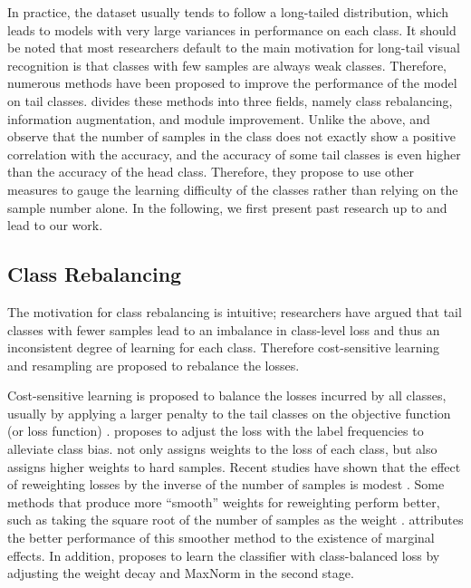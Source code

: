 \documentclass[10pt,twocolumn,letterpaper]{article}
\begin{document}
In practice, the dataset usually tends to follow a long-tailed distribution, which leads to models with very large variances in performance on each class. It should be noted that most researchers default to the main motivation for long-tail visual recognition is that classes with few samples are always weak classes. Therefore, numerous methods have been proposed to improve the performance of the model on tail classes. \cite{paper58} divides these methods into three fields, namely class rebalancing, information augmentation, and module improvement. Unlike the above, \cite{paper27} and \cite{paper28} observe that the number of samples in the class does not exactly show a positive correlation with the accuracy, and the accuracy of some tail classes is even higher than the accuracy of the head class. Therefore, they propose to use other measures to gauge the learning difficulty of the classes rather than relying on the sample number alone. In the following, we first present past research up to \cite{paper27}\cite{paper28} and lead to our work.


\subsection*{Class Rebalancing}
\label{secA.1}

The motivation for class rebalancing is intuitive; researchers have argued that tail classes with fewer samples lead to an imbalance in class-level loss and thus an inconsistent degree of learning for each class. Therefore cost-sensitive learning \cite{paper59,paper60,paper61,paper62} and resampling \cite{paper63, paper31,paper64,paper65} are proposed to rebalance the losses.

Cost-sensitive learning is proposed to balance the losses incurred by all classes, usually by applying a larger penalty to the tail classes on the objective function (or loss function) \cite{paper37,paper45,paper36,paper27,paper4,paper3}. \cite{paper36} proposes to adjust the loss with the label frequencies to alleviate class bias. \cite{paper3} not only assigns weights to the loss of each class, but also assigns higher weights to hard samples. Recent studies have shown that the effect of reweighting losses by the inverse of the number of samples is modest \cite{paper66,paper67}. Some methods that produce more ``smooth'' weights for reweighting perform better, such as taking the square root of the number of samples as the weight \cite{paper66}. \cite{paper4} attributes the better performance of this smoother method to the existence of marginal effects. In addition, \cite{paper68}proposes to learn the classifier with class-balanced loss by adjusting the weight decay and MaxNorm in the second stage.
\end{document}

